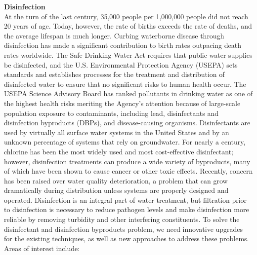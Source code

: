\documentclass{article}
\begin{document}
\textbf{Disinfection}\\
At the turn of the last century, 35,000 people per 1,000,000 people did not reach 20 years of age. Today, however, the rate of births exceeds the rate of deaths, and the average lifespan is much longer. Curbing waterborne disease through disinfection
has made a significant contribution to birth rates outpacing death rates worldwide. The Safe Drinking Water Act requires that public water supplies be disinfected, and the U.S. Environmental Protection Agency (USEPA) sets standards and establishes processes for the treatment and distribution of disinfected water to ensure that no significant risks to human health occur. The USEPA Science Advisory Board has ranked pollutants in drinking water as one of the highest health risks meriting the Agency’s attention because of large-scale population exposure to contaminants, including lead, disinfectants and disinfection byproducts (DBPs), and disease-causing organisms.
Disinfectants are used by virtually all surface water systems in the United States and by an unknown percentage of systems that rely on groundwater. For nearly a century, chlorine has been the most widely used and most cost-effective disinfectant; however, disinfection treatments can produce a wide variety of byproducts, many of which have been shown to cause cancer or other toxic effects. Recently, concern has been raised over water quality deterioration, a problem that can grow dramatically during distribution unless systems are properly designed and operated. Disinfection is an integral part of water treatment, but filtration prior to disinfection is necessary to reduce pathogen levels and make disinfection more reliable by removing turbidity and other interfering constituents.
To solve the disinfectant and disinfection byproducts problem, we need innovative upgrades for the existing techniques, as well as new approaches to address these problems. Areas of interest include:\\
\end{document}
